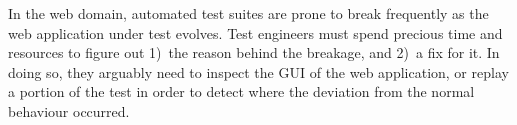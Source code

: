 In the web domain, automated test suites are prone to break frequently as the web application under test evolves. Test engineers must spend precious time and resources to figure out 1)~the reason behind the breakage, and 2)~a fix for it. In doing so, they arguably need to inspect the GUI of the web application, or replay a portion of the test in order to detect where the deviation from the normal behaviour occurred. 
